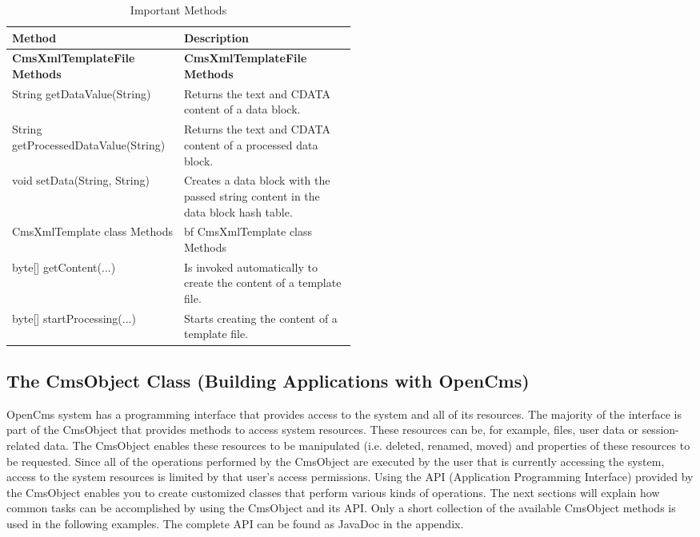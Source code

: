 \begin{center}
\begin{table}
\begin{tabular}{|l|p{0.50\linewidth}|}
\hline
{\bf Method}&
{\bf Description}\\ \hline
{\bf CmsXmlTemplateFile Methods} &
{\bf CmsXmlTemplateFile Methods}\\ \hline
String getDataValue(String)&
Returns the text and CDATA content of a data block. \\ \hline
String getProcessedDataValue(String)&
Returns the text and CDATA content of a processed data block. \\ \hline 
void setData(String, String)&
Creates a data block with the passed string content in the data block hash table. \\ \hline
CmsXmlTemplate class Methods &
{bf CmsXmlTemplate class Methods} \\ \hline
byte[] getContent(...)&
Is invoked automatically to create the content of a template file. \\ \hline
byte[] startProcessing(...)&
Starts creating the content of a template file.\\ \hline
\end{tabular}
\caption[Important Methods]{Important Methods}
\label{MostImport} 
\end{table}
\end{center}

\subsection{The CmsObject Class  (Building Applications with OpenCms)}
OpenCms system has a programming interface that provides access to the
system and all of its resources. The majority of the interface is part
of the CmsObject that provides methods to access system resources.
These resources can be, for example, files, user data or session-related
data. The CmsObject enables these resources to be manipulated (i.e.
deleted, renamed, moved) and properties of these resources to be
requested. Since all of the operations performed by the {\name CmsObject} are
executed by the user that is currently accessing the system, access to
the system resources is limited by that user's access permissions.
Using the API (Application Programming Interface) provided by the
{\name CmsObject} enables you to create customized classes that perform various
kinds of operations.
The next sections will explain how common tasks can be accomplished by
using the {\name CmsObject} and its API. Only a short collection of the
available {\name CmsObject} methods is used in the following examples. The
complete API can be found as JavaDoc in the appendix.

